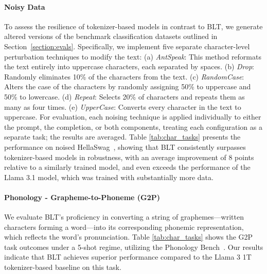 \paragraph{Noisy Data} To assess the resilience of tokenizer-based models in contrast to {\textsc BLT}, we generate altered versions of the benchmark classification datasets outlined in Section~\ref{section:evals}. Specifically, we implement five separate character-level perturbation techniques to modify the text: (a) \textit{AntSpeak}: This method reformats the text entirely into uppercase characters, each separated by spaces. (b) \textit{Drop}: Randomly eliminates 10\% of the characters from the text. (c) \textit{RandomCase}: Alters the case of the characters by randomly assigning 50\% to uppercase and 50\% to lowercase. (d) \textit{Repeat}: Selects 20\% of characters and repeats them as many as four times. (e) \textit{UpperCase}: Converts every character in the text to uppercase. For evaluation, each noising technique is applied individually to either the prompt, the completion, or both components, treating each configuration as a separate task; the results are averaged. Table \ref{tab:char_tasks} presents the performance on noised HellaSwag~\citep{Eval_hellaswag}, showing that {\textsc BLT} consistently surpasses tokenizer-based models in robustness, with an average improvement of 8 points relative to a similarly trained model, and even exceeds the performance of the Llama 3.1 model, which was trained with substantially more data.

\paragraph{Phonology - Grapheme-to-Phoneme (G2P)} We evaluate {\textsc BLT}'s proficiency in converting a string of graphemes—written characters forming a word—into its corresponding phonemic representation, which reflects the word's pronunciation. Table \ref{tab:char_tasks} shows the G2P task outcomes under a 5-shot regime, utilizing the Phonology Bench~\citep{suvarna2024phonologybench}. Our results indicate that {\textsc BLT} achieves superior performance compared to the Llama 3 1T tokenizer-based baseline on this task.


